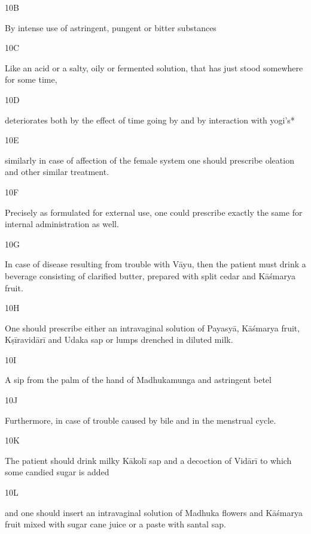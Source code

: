 \begin{translation}
\begin{tt}
\item[10B]

By intense use of astringent, pungent or bitter substances
  
\item[10C]

Like an acid or a salty, oily or fermented solution, that has just stood 
  somewhere for some time,
  
\item[10D]

deteriorates both by the effect of time going by and by interaction with 
  yogi’s*  
  
\item[10E]

similarly in case of affection of the female system one should prescribe 
  oleation and other  similar treatment.
  
\item[10F]

Precisely as formulated for external use, one could prescribe exactly 
  the same for internal administration as well.
  
\item[10G]

In case of disease resulting from trouble with Vāyu, then the patient 
  must drink a beverage consisting of clarified butter, prepared with split cedar 
  and Kāśmarya fruit.
  
\item[10H]

One should prescribe either an intravaginal solution of Payasyā, 
  Kāśmarya fruit, Kṣīravidārī and Udaka sap or lumps drenched in diluted milk.
  
\item[10I]

A sip from the palm of the hand of Madhukamunga and astringent betel
  
\item[10J]

Furthermore, in case of trouble caused by bile and in the menstrual 
  cycle.
  
\item[10K]

The patient should drink milky Kākolī sap and a decoction of Vidārī to 
  which some candied sugar is added
  
\item[10L]

and one should insert an intravaginal solution of Madhuka flowers and 
  Kāśmarya fruit mixed with sugar cane juice or a paste with santal sap.
  

\end{tt}
\end{translation}
